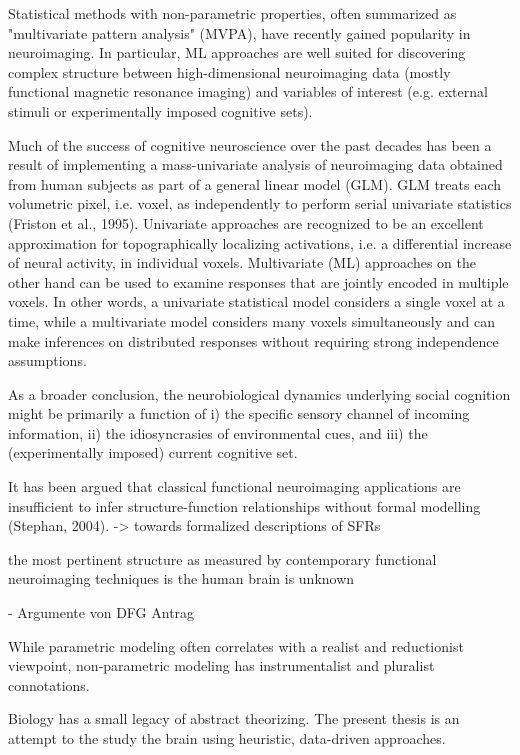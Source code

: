 \documentclass[authoryear,review,3p]{elsarticle}
\begin{document}
Statistical methods with non-parametric properties, often summarized as "multivariate pattern analysis" (MVPA), have recently gained popularity in neuroimaging. In particular, ML approaches are well suited for discovering complex structure between high-dimensional neuroimaging data (mostly functional magnetic resonance imaging) and variables of interest (e.g. external stimuli or experimentally imposed cognitive sets). 

Much of the success of cognitive neuroscience over the past decades has been a result of implementing a mass-univariate analysis of neuroimaging data obtained from human subjects as part of a general linear model (GLM). GLM treats each volumetric pixel, i.e. voxel, as independently to perform serial univariate statistics (Friston et al., 1995). 
Univariate approaches are recognized to be an excellent approximation for topographically localizing activations, i.e. a differential increase of neural activity, in individual voxels. Multivariate (ML) approaches on the other hand can be used to examine responses that are jointly encoded in multiple voxels. In other words, a univariate statistical model considers a single voxel at a time, while a multivariate model considers many voxels simultaneously and can make inferences on distributed responses without requiring strong independence assumptions. 

As a broader conclusion, the neurobiological dynamics underlying social cognition might be primarily a function of i) the specific sensory channel of incoming information, ii) the idiosyncrasies of environmental cues, and iii) the (experimentally imposed) current cognitive set.



It has been argued that classical functional neuroimaging applications
are insufficient to infer structure-function relationships
without formal modelling (Stephan, 2004).
-> towards formalized descriptions of SFRs

the most pertinent structure as measured by
contemporary functional neuroimaging techniques
is the human brain is unknown

- Argumente von DFG Antrag

While parametric modeling often correlates with a realist and reductionist viewpoint, non-parametric modeling has instrumentalist and pluralist connotations.

Biology has a small legacy of abstract theorizing.
The present thesis is an attempt to the study the brain using
heuristic, data-driven approaches.
\end{document}
